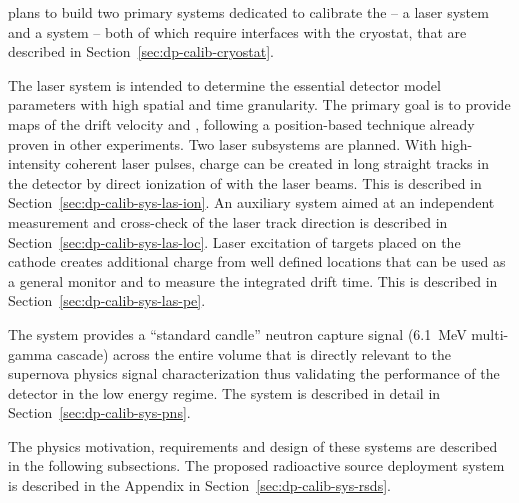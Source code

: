  plans to build two primary systems dedicated to calibrate the  -- a laser system
and a  system -- both of which require interfaces with the cryostat, that are described in Section~\ref{sec:dp-calib-cryostat}.

The laser system is %
intended to determine the essential detector model parameters with high spatial and time granularity. The primary goal is to provide maps of the drift velocity and \efield, following a position-based technique already proven in other  experiments. Two laser subsystems are planned. With high-intensity coherent laser pulses, charge can be created in long straight tracks in the detector by direct ionization of  with the laser beams. This is described in Section~\ref{sec:dp-calib-sys-las-ion}. An auxiliary system aimed at an independent measurement and cross-check of the laser track direction is described in Section~\ref{sec:dp-calib-sys-las-loc}.
Laser excitation of targets placed on the cathode creates additional charge from well defined locations that can be used 
as a general  monitor and to measure the integrated drift time. This is described in Section~\ref{sec:dp-calib-sys-las-pe}. 

The  system provides a ``standard candle'' neutron capture signal (\SI{6.1}{\MeV} multi-gamma cascade) across the entire   volume that is directly relevant to the supernova physics signal characterization thus validating the performance of the detector in the low energy regime. The  system is described in detail in Section~\ref{sec:dp-calib-sys-pns}.  

The physics motivation, requirements and design of these systems are described in the following subsections. The proposed radioactive source deployment system is described in the Appendix in Section~\ref{sec:dp-calib-sys-rsds}. 

